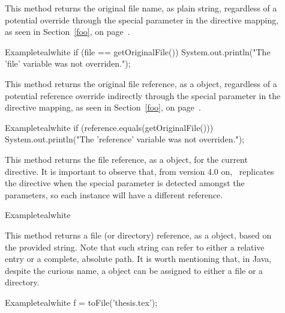 \begin{description}
\item[] This method returns the original file name, as plain string, regardless of a potential override through the special  parameter in the directive mapping, as seen in Section~\ref{foo}, on page~\pageref{foo}.

\begin{codebox}{Example}{teal}{\icnote}{white}
if (file == getOriginalFile()) {
    System.out.println("The 'file' variable
       was not overriden.");
}
\end{codebox}

\item[] This method returns the original file reference, as a  object, regardless of a potential reference override indirectly through the special  parameter in the directive mapping, as seen in Section~\ref{foo}, on page~\pageref{foo}.

\begin{codebox}{Example}{teal}{\icnote}{white}
if (reference.equals(getOriginalFile())) {
    System.out.println("The 'reference' variable
       was not overriden.");
}
\end{codebox}

\item[] This method returns the file reference, as a  object, for the current directive. It is important to observe that, from version 4.0 on, \arara\ replicates the directive when the special  parameter is detected amongst the parameters, so each instance will have a different reference.

\begin{codebox}{Example}{teal}{\icnote}{white}
\end{codebox}

\item[] This method returns a file (or directory) reference, as a  object, based on the provided string. Note that such string can refer to either a relative entry or a complete, absolute path. It is worth mentioning that, in Java, despite the curious name, a  object can be assigned to either a file or a directory.

\begin{codebox}{Example}{teal}{\icnote}{white}
f = toFile('thesis.tex');
\end{codebox}


\end{description}
